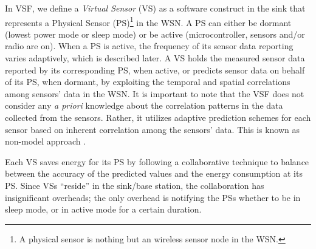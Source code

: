 \documentclass[a4paper,conference]{IEEEtran}
\begin{document}
In VSF, we define a {\it Virtual Sensor} (VS) as a software construct in the sink that represents a Physical Sensor (PS)\footnote{A physical sensor is nothing but an wireless sensor node in the WSN.} in the WSN. A PS can either be dormant (lowest power mode or sleep mode) or be active (microcontroller, sensors and/or radio are on). When a PS is active, the frequency of its sensor data reporting varies adaptively, which is described later. A VS holds the measured sensor data reported by its corresponding PS, when active, or predicts sensor data on behalf of its PS, when dormant, by exploiting the temporal and spatial correlations among {sensors\textquoteright} data in the WSN. It is important to note that the VSF does not consider any \textit{a priori} knowledge about the correlation patterns in the data collected from the sensors. Rather, it utilizes adaptive prediction schemes for each sensor based on inherent correlation among the {sensors\textquoteright} data.  This is known as non-model approach \cite{santini2006adaptive}. 

Each VS saves energy for its PS by following a collaborative technique to balance between the accuracy of the predicted values and the energy consumption at its PS. Since VSs {\textquotedblleft reside\textquotedblright} in the sink/base station, the collaboration has insignificant overheads; the only overhead is notifying the PSs whether to be in sleep mode, or in active mode for a certain duration. 
\end{document}
